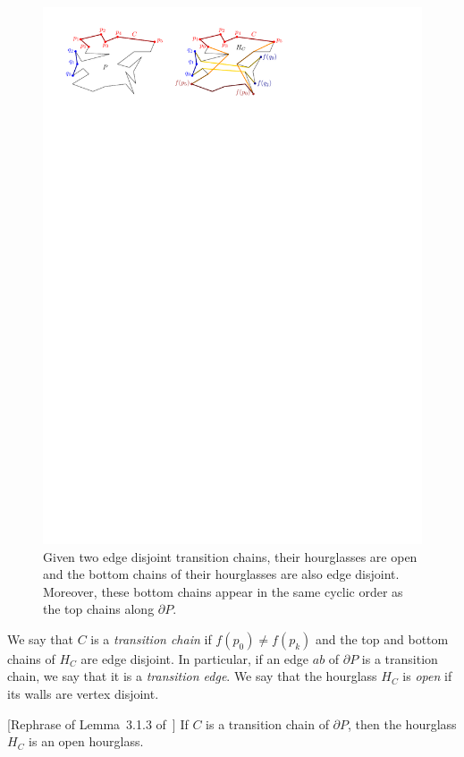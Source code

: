 \documentclass[a4paper,UKenglish]{lipics}
\newcommand{\ff}[1]{\ensuremath{f(#1)}}
\begin{document}
\begin{figure}[tb]
\centering
\includegraphics{img/TransitionChains.pdf}
\caption{\small Given two edge disjoint transition chains, their hourglasses are open and
the bottom chains of their hourglasses are also edge disjoint. 
Moreover, these bottom chains appear in the same cyclic order as the top chains along $\partial P$.}
\label{fig:Transition chains and hourglasses}
\end{figure}


We say that $C$ is a \emph{transition chain} if $\ff{p_0} \neq \ff{p_k}$ and the top and bottom chains of $H_C$ are edge disjoint.
In particular, if an edge $ab$ of $\partial P$ is a transition chain, we say that it is a \emph{transition edge}.
We say that the hourglass $H_C$ is \emph{open} if its walls are vertex disjoint. 

\begin{lemma}\label{lemma:Transition hourglasses are open}
[Rephrase of Lemma~3.1.3 of~\cite{aronov1993furthest}] 
If $C$ is a transition chain of $\partial P$, then the hourglass $H_C$ is an open hourglass.
\end{lemma}
\end{document}
